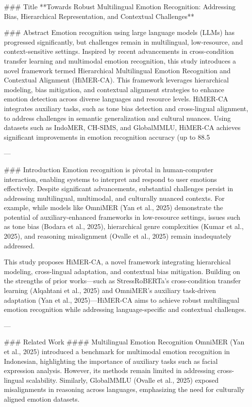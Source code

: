 ### Title  
**Towards Robust Multilingual Emotion Recognition: Addressing Bias, Hierarchical Representation, and Contextual Challenges**

### Abstract  
Emotion recognition using large language models (LLMs) has progressed significantly, but challenges remain in multilingual, low-resource, and context-sensitive settings. Inspired by recent advancements in cross-condition transfer learning and multimodal emotion recognition, this study introduces a novel framework termed Hierarchical Multilingual Emotion Recognition and Contextual Alignment (HiMER-CA). This framework leverages hierarchical modeling, bias mitigation, and contextual alignment strategies to enhance emotion detection across diverse languages and resource levels. HiMER-CA integrates auxiliary tasks, such as tone bias detection and cross-lingual alignment, to address challenges in semantic generalization and cultural nuances. Using datasets such as IndoMER, CH-SIMS, and GlobalMMLU, HiMER-CA achieves significant improvements in emotion recognition accuracy (up to 88.5%

---

### Introduction  
Emotion recognition is pivotal in human-computer interaction, enabling systems to interpret and respond to user emotions effectively. Despite significant advancements, substantial challenges persist in addressing multilingual, multimodal, and culturally nuanced contexts. For example, while models like OmniMER (Yan et al., 2025) demonstrate the potential of auxiliary-enhanced frameworks in low-resource settings, issues such as tone bias (Bodara et al., 2025), hierarchical genre complexities (Kumar et al., 2025), and reasoning misalignment (Ovalle et al., 2025) remain inadequately addressed.

This study proposes HiMER-CA, a novel framework integrating hierarchical modeling, cross-lingual adaptation, and contextual bias mitigation. Building on the strengths of prior works—such as StressRoBERTa's cross-condition transfer learning (Alqahtani et al., 2025) and OmniMER's auxiliary task-driven adaptation (Yan et al., 2025)—HiMER-CA aims to achieve robust multilingual emotion recognition while addressing language-specific and contextual challenges.

---

### Related Work  
#### Multilingual Emotion Recognition  
OmniMER (Yan et al., 2025) introduced a benchmark for multimodal emotion recognition in Indonesian, highlighting the importance of auxiliary tasks such as facial expression analysis. However, its methods remain limited in addressing cross-lingual scalability. Similarly, GlobalMMLU (Ovalle et al., 2025) exposed misalignments in reasoning across languages, emphasizing the need for culturally aligned emotion datasets.

